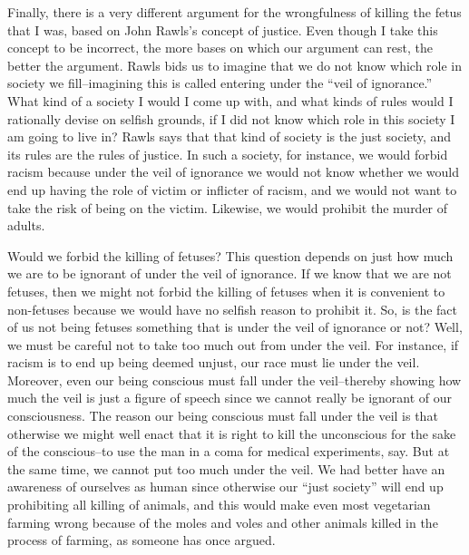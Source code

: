 Finally, there is a very different argument for the wrongfulness of 
killing  the fetus that I was, based on John Rawls’s concept of justice.  
Even though I take this concept to be incorrect, the more bases on which 
our argument can rest, the better the argument. Rawls bids us to imagine 
that we do not know which role in society we fill–imagining this is called 
entering under the “veil of ignorance.”  What kind of a society I would I 
come  up  with,  and  what  kinds  of  rules  would  I  rationally  devise  on 
selfish grounds, if I did not know which role in this society I am going to 
live in?  Rawls says that that kind of society is the just society, and its 
rules are the rules of justice.  In such a society, for instance, we would 
forbid racism because under the veil of ignorance we would not know 
whether we would end up having the role of victim or inflicter of racism, 
and we would not want to take the risk of being on the victim.  Likewise, 
we would prohibit the murder of adults. 

Would we forbid the killing of fetuses?  This question depends on 
just how much we are to be ignorant of under the veil of ignorance.  If we 
know  that  we  are  not  fetuses,  then  we  might  not  forbid  the  killing  of 
fetuses when it is convenient to non-fetuses because we would have no 
selfish  reason  to  prohibit  it.    So,  is  the  fact  of  us  not  being  fetuses 
something that is under the veil of ignorance or not?  Well, we must be 
careful  not to take too much out from under the veil.  For instance, if 
racism is to end up being deemed unjust, our race must lie under the veil. 
Moreover,  even  our  being  conscious  must  fall  under  the  veil–thereby 
showing how much the veil is just a figure of speech since we cannot 
really be ignorant of our consciousness.  The reason our being conscious 
must fall under the veil is that otherwise we might well enact that it is 
right to kill the unconscious for the sake of the conscious–to use the man 
in a coma for medical experiments, say.  But at the same time, we cannot
put  too  much  under  the  veil.    We  had  better  have  an  awareness  of 
ourselves  as  human  since  otherwise  our  “just  society”  will  end  up 
prohibiting  all  killing  of  animals,  and  this  would  make  even  most 
vegetarian  farming  wrong  because  of  the  moles  and  voles  and  other 
animals killed in the process of farming, as someone has once argued. 

